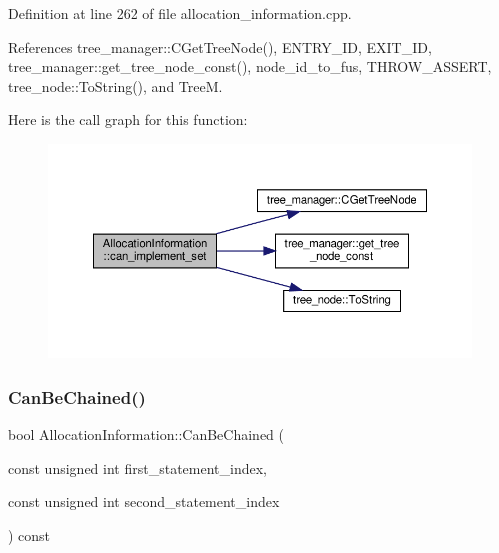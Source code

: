 Definition at line 262 of file allocation\+\_\+information.\+cpp.



References tree\+\_\+manager\+::\+C\+Get\+Tree\+Node(), E\+N\+T\+R\+Y\+\_\+\+ID, E\+X\+I\+T\+\_\+\+ID, tree\+\_\+manager\+::get\+\_\+tree\+\_\+node\+\_\+const(), node\+\_\+id\+\_\+to\+\_\+fus, T\+H\+R\+O\+W\+\_\+\+A\+S\+S\+E\+RT, tree\+\_\+node\+::\+To\+String(), and TreeM.

Here is the call graph for this function\+:
\nopagebreak
\begin{figure}[H]
\begin{center}
\leavevmode
\includegraphics[width=350pt]{d7/d79/classAllocationInformation_aa232c85d830198cd536e5c38135f75b8_cgraph}
\end{center}
\end{figure}
\mbox{\label{classAllocationInformation_ab38098c58dccc26bf6c3b8b948376911}} 
\subsubsection{\texorpdfstring{Can\+Be\+Chained()}{CanBeChained()}\hspace{0.1cm}{\footnotesize\ttfamily [1/2]}}
{\footnotesize\ttfamily bool Allocation\+Information\+::\+Can\+Be\+Chained (\begin{DoxyParamCaption}\item[{const unsigned int}]{first\+\_\+statement\+\_\+index,  }\item[{const unsigned int}]{second\+\_\+statement\+\_\+index }\end{DoxyParamCaption}) const}



